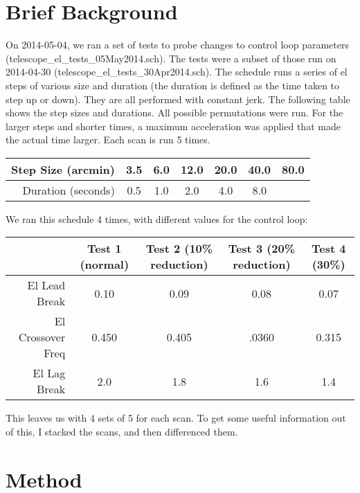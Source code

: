 \documentclass{article}
\begin{document}
\section{Brief Background}
On 2014-05-04, we ran a set of tests to probe changes to control loop 
parameters (telescope\_el\_tests\_05May2014.sch).  The tests were a subset of 
those run on 2014-04-30 (telescope\_el\_tests\_30Apr2014.sch).  
The schedule runs
a series of el steps of various size and duration (the duration is defined as 
the time taken to step up or down).  They are all performed with
constant jerk.  The following table shows the step sizes and durations.  All
possible permutations were run.  For the larger steps and shorter times, a
maximum acceleration was applied that made the actual time larger.  Each scan 
is run 5 times.

\begin{tabular}{|r|c|c|c|c|c|c|}
  \hline 
  Step Size (arcmin) & 3.5 & 6.0 & 12.0 & 20.0 & 40.0 & 80.0 \\
  \hline
  Duration (seconds) & 0.5 & 1.0 & 2.0 & 4.0 & 8.0  &  \\
  \hline
\end{tabular}

We ran this schedule 4 times, with different values for the control loop:

\begin{tabular}{|r|c|c|c|c|}
  \hline
   & Test 1 (normal) & Test 2 (10\% reduction) & 
  Test 3 (20\% reduction) & Test 4 (30\%) \\
  \hline
  El Lead Break & 0.10 & 0.09 & 0.08 & 0.07 \\
  El Crossover Freq & 0.450 & 0.405 & .0360 & 0.315 \\
  El Lag Break & 2.0 & 1.8 & 1.6 & 1.4 \\
  \hline
\end{tabular}

This leaves us with 4 sets of 5 for each scan.  To get some useful information
out of this, I stacked the scans, and then differenced them.

\section{Method}

\end{document}
